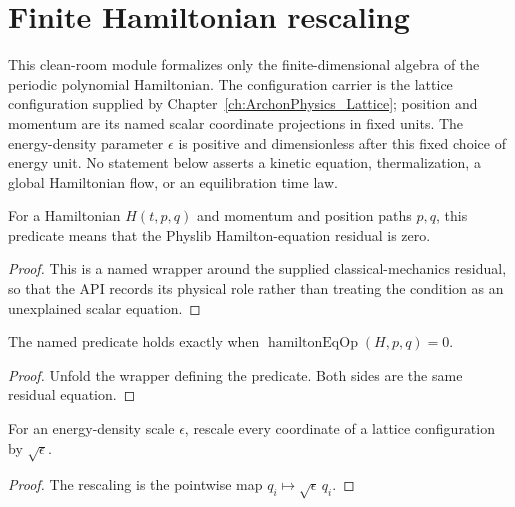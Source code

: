 
\chapter{Finite Hamiltonian rescaling}
\label{ch:ArchonPhysics_HamiltonianScaling}

This clean-room module formalizes only the finite-dimensional algebra of the
periodic polynomial Hamiltonian.  The configuration carrier is the lattice
configuration supplied by Chapter~\ref{ch:ArchonPhysics_Lattice}; position and
momentum are its named scalar coordinate projections in fixed units.  The
energy-density parameter $\epsilon$ is positive and dimensionless after this
fixed choice of energy unit.  No statement below asserts a kinetic equation,
thermalization, a global Hamiltonian flow, or an equilibration time law.

\begin{definition}
\label{def:hamiltonian:satisfies-equations}
For a Hamiltonian $H(t,p,q)$ and momentum and position paths $p,q$, this
predicate means that the Physlib Hamilton-equation residual is zero.
\end{definition}
\begin{proof}

\leanok
This is a named wrapper around the supplied classical-mechanics residual, so
that the API records its physical role rather than treating the condition as an
unexplained scalar equation.
\end{proof}

\begin{theorem}
\label{thm:hamiltonian:satisfies-iff}
The named predicate holds exactly when
$\operatorname{hamiltonEqOp}(H,p,q)=0$.
\end{theorem}
\begin{proof}

\leanok
Unfold the wrapper defining the predicate.  Both sides are the same residual
equation.
\end{proof}

\begin{definition}
\label{def:hamiltonian:rescale-configuration}
For an energy-density scale $\epsilon$, rescale every coordinate of a lattice
configuration by $\sqrt{\epsilon}$.
\end{definition}
\begin{proof}

\leanok
The rescaling is the pointwise map $q_i\mapsto\sqrt{\epsilon}\,q_i$.
\end{proof}

